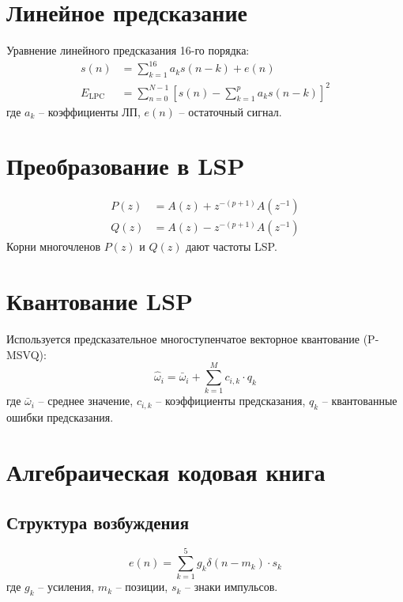 \documentclass{report}
\begin{document}
	\section{Линейное предсказание}
	Уравнение линейного предсказания 16-го порядка:
	\begin{align}
		s(n) &= \sum_{k=1}^{16} a_k s(n-k) + e(n) \\
		E_{\text{LPC}} &= \sum_{n=0}^{N-1} \left[ s(n) - \sum_{k=1}^{p} a_k s(n-k) \right]^2
	\end{align}
	где $a_k$ -- коэффициенты ЛП, $e(n)$ -- остаточный сигнал.
	
	\section{Преобразование в LSP}
	\begin{align}
		P(z) &= A(z) + z^{-(p+1)}A(z^{-1}) \\
		Q(z) &= A(z) - z^{-(p+1)}A(z^{-1})
	\end{align}
	Корни многочленов $P(z)$ и $Q(z)$ дают частоты LSP.
	
	\section{Квантование LSP}
	Используется предсказательное многоступенчатое векторное квантование (P-MSVQ):
	\begin{equation}
		\hat{\omega}_i = \bar{\omega}_i + \sum_{k=1}^{M} c_{i,k} \cdot q_k
	\end{equation}
	где $\bar{\omega}_i$ -- среднее значение, $c_{i,k}$ -- коэффициенты предсказания, $q_k$ -- квантованные ошибки предсказания.
	
	\section{Алгебраическая кодовая книга}
	\subsection{Структура возбуждения}
	\begin{equation}
		e(n) = \sum_{k=1}^{5} g_k \delta(n - m_k) \cdot s_k
	\end{equation}
	где $g_k$ -- усиления, $m_k$ -- позиции, $s_k$ -- знаки импульсов.
	
\end{document}
